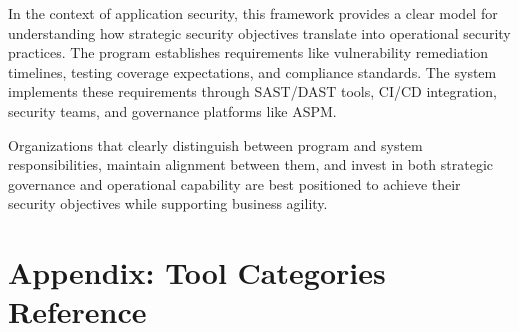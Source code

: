 \documentclass[11pt,letterpaper]{article}
\begin{document}
In the context of application security, this framework provides a clear model for understanding how strategic security objectives translate into operational security practices. The program establishes requirements like vulnerability remediation timelines, testing coverage expectations, and compliance standards. The system implements these requirements through SAST/DAST tools, CI/CD integration, security teams, and governance platforms like ASPM.

Organizations that clearly distinguish between program and system responsibilities, maintain alignment between them, and invest in both strategic governance and operational capability are best positioned to achieve their security objectives while supporting business agility.

\vspace{1cm}

\begin{center}
\end{center}

\newpage
\appendix
\section{Appendix: Tool Categories Reference}
\end{document}
